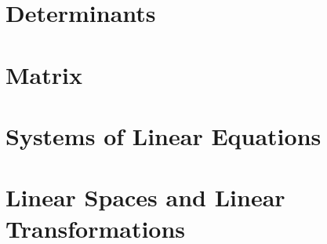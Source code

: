 \documentclass{report}
\begin{document}
	
	\thispagestyle{empty}
	\newpage%
	\tableofcontents
  
  \chapter{Determinants}
  
  \chapter{Matrix}
  
  \chapter{Systems of Linear Equations}
  
  \chapter{Linear Spaces and Linear Transformations}
  

  


  
\end{document}

